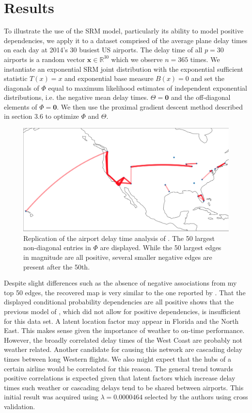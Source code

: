 \documentclass{samkoelleprelimworking}
\begin{document}
 \section{Results} 
 
 To illustrate the use of the SRM model, particularly its ability to model positive dependencies, we apply it to a dataset comprised of the average plane delay times on each day at 2014's 30 busiest US airports.  The delay time of all $p = 30$ airports is a random vector $\bm{x} \in \mathbb{R}^{30}$ which we observe $n=365$ times.  We instantiate an exponential SRM joint distribution with the exponential sufficient statistic $T(x) = x$ and exponential base measure $B(x) = 0$ and set the diagonals of $\Phi$ equal to maximum likelihood estimates of independent exponential distributions, i.e. the negative mean delay times.  $\Theta = \bm{0}$ and the off-diagonal elements of $\Phi = \bm{0}$.  We then use the proximal gradient descent method described in section 3.6 to optimize $\Phi$ and $\Theta$.  
 
 \begin{figure}\label{fig:map}
\includegraphics[width=\textwidth]{map}
\caption{Replication of the airport delay time analysis of \citep{Inouye}.  The 50 largest non-diagonal entries in $\Phi$ are displayed. While the 50 largest edges in magnitude are all positive, several smaller negative edges are present after the 50th. }
\end{figure}

Despite slight differences such as the absence of negative associations from my top 50 edges, the recovered map is very similar to the one reported by \citep{Inouye2016-hl}.  That the displayed conditional probability dependencies are all positive shows that the previous model of \citep{Yang}, which did not allow for positive dependencies, is insufficient for this data set.  A latent location factor may appear in Florida and the North East.  This makes sense given the importance of weather to on-time performance.  However, the broadly correlated delay times of the West Coast are probably not weather related.  Another candidate for causing this network are cascading delay times between long Western flights. We also might expect that the hubs of a certain airline would be correlated for this reason.  The general trend towards positive correlations is expected given that latent factors which increase delay times such weather or cascading delays tend to be shared between airports. This initial result was acquired using $\lambda = 0.0000464$ selected by the authors using cross validation.
\end{document}
